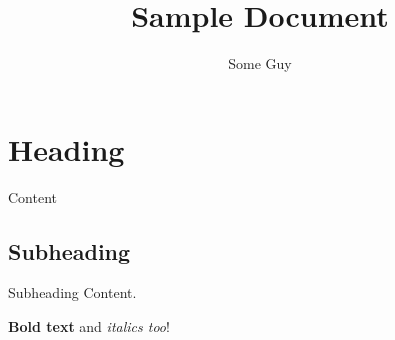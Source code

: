 \documentclass[10pt]{article}
\title{\large{\textbf{Sample Document}}}
\author{Some Guy}
\date{}
\begin{document}
\maketitle

\thispagestyle{firststyle}
\section{Heading}
Content
\subsection{Subheading}
Subheading Content.

\textbf{Bold text} and \textit{italics too}!
\end{document}
